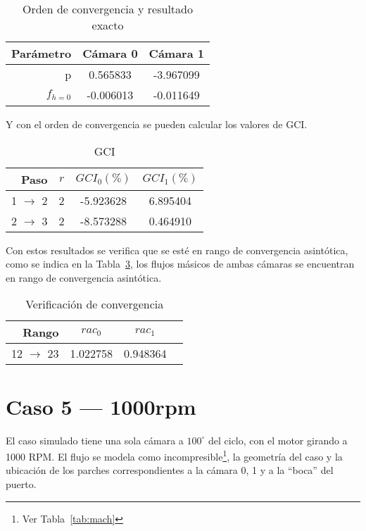 \begin{table}
    \centering
    \begin{tabular}{rcc}\toprule
        Parámetro & Cámara 0  & Cámara 1  \\ \midrule
        p         &  0.565833 & -3.967099 \\
        $f_{h=0}$ & -0.006013 & -0.011649 \\ \bottomrule
    \end{tabular}
    \caption{Orden de convergencia y resultado exacto}\label{tab:res1_caso0}
\end{table}

Y con el orden de convergencia se pueden calcular los valores de GCI.

\begin{table}
    \centering
    \begin{tabular}{rccc}\toprule
        Paso              & $r$ & $GCI_0(\%)$ & $GCI_1(\%)$ \\ \midrule
        1 $\rightarrow$ 2 & 2   & -5.923628   & 6.895404 \\
        2 $\rightarrow$ 3 & 2   & -8.573288   & 0.464910 \\ \bottomrule
    \end{tabular}
    \caption{GCI}\label{tab:gci_caso_0}
\end{table}

Con estos resultados se verifica que se esté en rango de convergencia
asintótica, como se indica en la Tabla~\ref{tab:rac_caso_0}, los flujos
másicos de ambas cámaras se encuentran en rango de convergencia asintótica.

\begin{table}
    \centering
    \begin{tabular}{rccc}\toprule
        Rango               & $rac_0$  & $rac_1$ \\ \midrule
        12 $\rightarrow$ 23 & 1.022758 & 0.948364 \\ \bottomrule
    \end{tabular}
    \caption{Verificación de convergencia}\label{tab:rac_caso_0}
\end{table}


\section{Caso 5 --- 1000rpm}

El caso simulado tiene una sola cámara a $100^{\circ}$ del ciclo, con el motor
girando a 1000 RPM.
%
El flujo se modela como incompresible\footnote{Ver Tabla~\ref{tab:mach}}, la
geometría del caso y la ubicación de los parches correspondientes a la cámara
0, 1 y a la ``boca'' del puerto.

